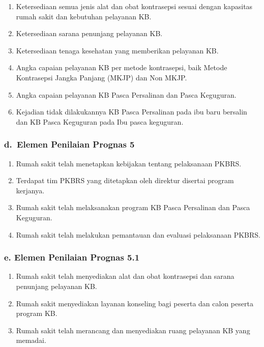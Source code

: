 \documentclass[
]{book}
\providecommand{\tightlist}{%
  \setlength{\itemsep}{0pt}\setlength{\parskip}{0pt}}
\begin{document}
\begin{enumerate}
\def\labelenumi{\alph{enumi}.}
\tightlist
\item
  Ketersediaan semua jenis alat dan obat kontrasepsi sesuai dengan kapasitas rumah sakit dan kebutuhan pelayanan KB.
\item
  Ketersediaan sarana penunjang pelayanan KB.
\item
  Ketersediaan tenaga kesehatan yang memberikan pelayanan KB.
\item
  Angka capaian pelayanan KB per metode kontrasepsi, baik Metode Kontrasepsi Jangka Panjang (MKJP) dan Non MKJP.
\item
  Angka capaian pelayanan KB Pasca Persalinan dan Pasca Keguguran.
\item
  Kejadian tidak dilakukannya KB Pasca Persalinan pada ibu baru bersalin dan KB Pasca Keguguran pada Ibu pasca keguguran.
\end{enumerate}

\hypertarget{d.-elemen-penilaian-prognas-5}{%
\subsubsection*{d.~Elemen Penilaian Prognas 5}\label{d.-elemen-penilaian-prognas-5}}

\begin{enumerate}
\def\labelenumi{\arabic{enumi}.}
\tightlist
\item
  Rumah sakit telah menetapkan kebijakan tentang pelaksanaan PKBRS.
\item
  Terdapat tim PKBRS yang ditetapkan oleh direktur disertai program kerjanya.
\item
  Rumah sakit telah melaksanakan program KB Pasca Persalinan dan Pasca Keguguran.
\item
  Rumah sakit telah melakukan pemantauan dan evaluasi pelaksanaan PKBRS.
\end{enumerate}

\hypertarget{e.-elemen-penilaian-prognas-5.1}{%
\subsubsection*{e. Elemen Penilaian Prognas 5.1}\label{e.-elemen-penilaian-prognas-5.1}}

\begin{enumerate}
\def\labelenumi{\arabic{enumi}.}
\tightlist
\item
  Rumah sakit telah menyediakan alat dan obat kontrasepsi dan sarana penunjang pelayanan KB.
\item
  Rumah sakit menyediakan layanan konseling bagi peserta dan calon peserta program KB.
\item
  Rumah sakit telah merancang dan menyediakan ruang pelayanan KB yang memadai.
\end{enumerate}

  
\end{document}
